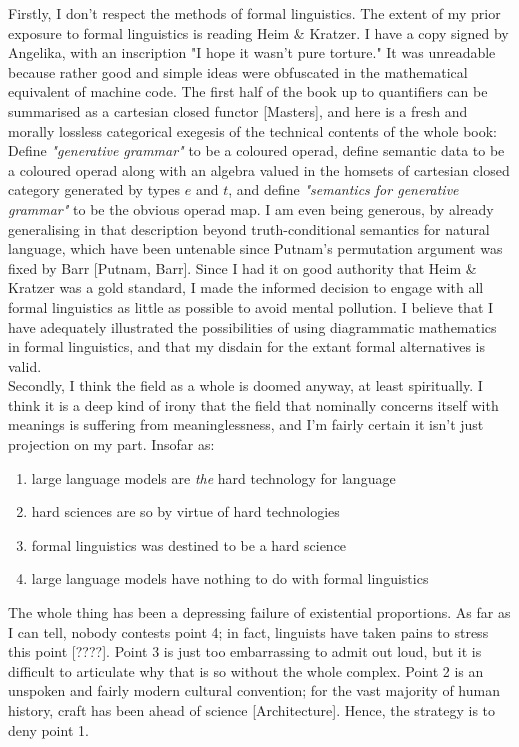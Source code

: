 Firstly, I don't respect the methods of formal linguistics. The extent of my prior exposure to formal linguistics is reading Heim \& Kratzer. I have a copy signed by Angelika, with an inscription "I hope it wasn't pure torture." It was unreadable because rather good and simple ideas were obfuscated in the mathematical equivalent of machine code. The first half of the book up to quantifiers can be summarised as a cartesian closed functor [Masters], and here is a fresh and morally lossless categorical exegesis of the technical contents of the whole book: Define \emph{"generative grammar"} to be a coloured operad, define semantic data to be a coloured operad along with an algebra valued in the homsets of cartesian closed category generated by types $e$ and $t$, and define \emph{"semantics for generative grammar"} to be the obvious operad map. I am even being generous, by already generalising in that description beyond truth-conditional semantics for natural language, which have been untenable since Putnam's permutation argument was fixed by Barr [Putnam, Barr]. Since I had it on good authority that Heim \& Kratzer was a gold standard, I made the informed decision to engage with all formal linguistics as little as possible to avoid mental pollution. I believe that I have adequately illustrated the possibilities of using diagrammatic mathematics in formal linguistics, and that my disdain for the extant formal alternatives is valid.\\

Secondly, I think the field as a whole is doomed anyway, at least spiritually. I think it is a deep kind of irony that the field that nominally concerns itself with meanings is suffering from meaninglessness, and I'm fairly certain it isn't just projection on my part. Insofar as:
\begin{enumerate}
\item large language models are \emph{the} hard technology for language
\item hard sciences are so by virtue of hard technologies
\item formal linguistics was destined to be a hard science
\item large language models have nothing to do with formal linguistics
\end{enumerate}
The whole thing has been a depressing failure of existential proportions. As far as I can tell, nobody contests point 4; in fact, linguists have taken pains to stress this point [????]. Point 3 is just too embarrassing to admit out loud, but it is difficult to articulate why that is so without the whole complex. Point 2 is an unspoken and fairly modern cultural convention; for the vast majority of human history, craft has been ahead of science [Architecture]. Hence, the strategy is to deny point 1.

